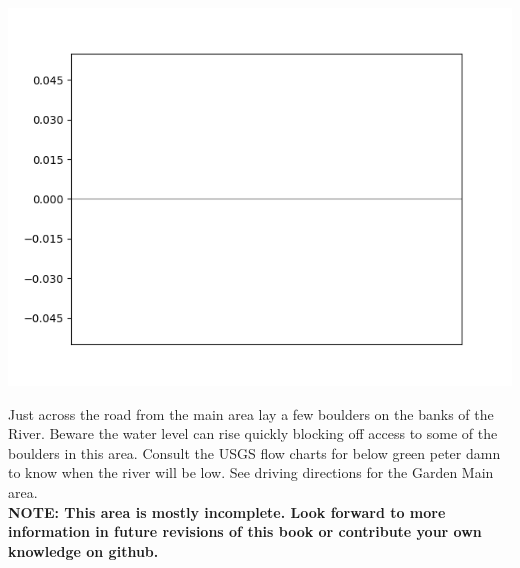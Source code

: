 










\raggedcolumns
\begin{multicols}{2}

\includegraphics[width=0.9\linewidth]{./maps/plots//Pink Tag Boulders.png}
\end{multicols}
\begin{multicols}{2}
Just across the road from the main area lay a few boulders on the banks of the River. Beware the water level can rise quickly blocking off access to some of the boulders in this area. Consult the USGS flow charts for below green peter damn to know when the river will be low. See driving directions for the Garden Main area.\\

\textbf{NOTE: This area is mostly incomplete. Look forward to more information in future revisions of this book or contribute your own knowledge on github.}\\


\newpage






\end{multicols}
\clearpage